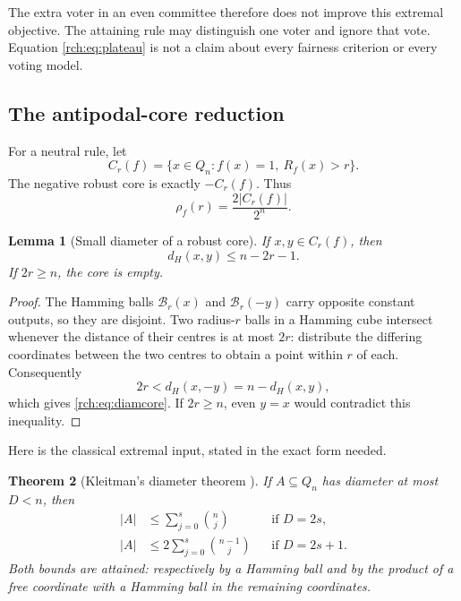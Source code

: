 \documentclass[11pt]{article}
\newtheorem{theorem}{Theorem}[section]
\newtheorem{lemma}[theorem]{Lemma}
\theoremstyle{definition}
\theoremstyle{remark}
\newcommand{\dist}{d_H}
\newcommand{\Ball}{\mathcal B}
\begin{document}
The extra voter in an even committee therefore does not improve this extremal
objective. The attaining rule may distinguish one voter and ignore that vote.
Equation \eqref{rch:eq:plateau} is not a claim about every fairness criterion or every
voting model.

\subsection{The antipodal-core reduction}

For a neutral rule, let
\begin{equation}
 C_r(f)=\{x\in Q_n:f(x)=1,\ R_f(x)>r\}.
 \label{rch:eq:core}
\end{equation}
The negative robust core is exactly \(-C_r(f)\). Thus
\begin{equation}
 \rho_f(r)=\frac{2|C_r(f)|}{2^n}.
 \label{rch:eq:corecount}
\end{equation}

\begin{lemma}[Small diameter of a robust core]
\label{rch:lem:core}
If \(x,y\in C_r(f)\), then
\begin{equation}
 \dist(x,y)\le n-2r-1.
 \label{rch:eq:diamcore}
\end{equation}
If \(2r\ge n\), the core is empty.
\end{lemma}

\begin{proof}
The Hamming balls \(\Ball_r(x)\) and \(\Ball_r(-y)\) carry opposite constant
outputs, so they are disjoint. Two radius-\(r\) balls in a Hamming cube intersect
whenever the distance of their centres is at most \(2r\): distribute the differing
coordinates between the two centres to obtain a point within \(r\) of each.
Consequently
\[
 2r<\dist(x,-y)=n-\dist(x,y),
\]
which gives \eqref{rch:eq:diamcore}. If \(2r\ge n\), even \(y=x\) would contradict
this inequality.
\end{proof}

Here is the classical extremal input, stated in the exact form needed.

\begin{theorem}[Kleitman's diameter theorem \cite{Kleitman,HKP}]
\label{rch:thm:kleitman}
If \(A\subseteq Q_n\) has diameter at most \(D<n\), then
\begin{align}
 |A|&\le\sum_{j=0}^{s}\binom nj &&\text{if }D=2s,\label{rch:eq:kleiteven}\\
 |A|&\le2\sum_{j=0}^{s}\binom{n-1}j &&\text{if }D=2s+1.
 \label{rch:eq:kleitodd}
\end{align}
Both bounds are attained: respectively by a Hamming ball and by the product of
a free coordinate with a Hamming ball in the remaining coordinates.
\end{theorem}
\end{document}

